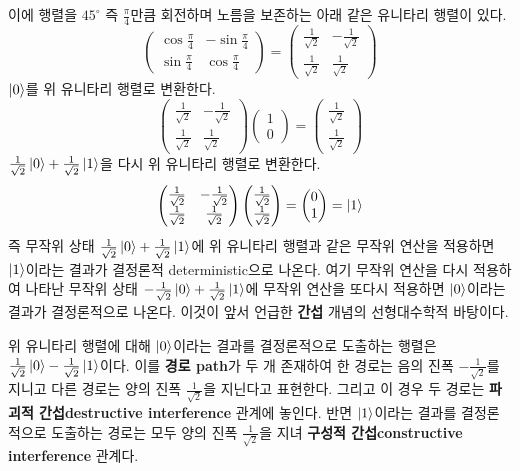 \documentclass[a4paper,chapter,atbegshi]{oblivoir}
\begin{document}
이에 행렬을 $45^{\circ}$ 즉 $\frac{\pi}{4}$만큼 회전하며 노름을 보존하는
아래 같은 유니타리 행렬이 있다.
\[
  \begin{pmatrix}
    \cos\frac{\pi}{4} &-\sin\frac{\pi}{4}\\
    \sin\frac{\pi}{4} &\cos\frac{\pi}{4}
  \end{pmatrix}
  = \begin{pmatrix}
    \frac{1}{\sqrt{2}} &-\frac{1}{\sqrt{2}} \\
    \frac{1}{\sqrt{2}} &\frac{1}{\sqrt2}
  \end{pmatrix}
\]
$\ket0$를 위 유니타리 행렬로 변환한다.
\begin{equation}\label{eq:1-2}
  \begin{pmatrix}
    \frac{1}{\sqrt{2}} &-\frac{1}{\sqrt{2}} \\
    \frac{1}{\sqrt{2}} &\frac{1}{\sqrt2}
  \end{pmatrix}
  \begin{pmatrix}
    1\\0
  \end{pmatrix}
  =\begin{pmatrix}
    \frac{1}{\sqrt2}\\\frac{1}{\sqrt2}
  \end{pmatrix}
\end{equation}
$\frac{1}{\sqrt2}\ket{0}+\frac{1}{\sqrt2}\ket{1}$을 다시 위 유니타리 행렬로
변환한다.
\[
  \begin{pmatrix}
    \frac{1}{\sqrt{2}} &-\frac{1}{\sqrt{2}} \\
    \frac{1}{\sqrt{2}} &\frac{1}{\sqrt2}
  \end{pmatrix}
  \begin{pmatrix}
    \frac{1}{\sqrt2}\\\frac{1}{\sqrt2}
  \end{pmatrix}
  =\begin{pmatrix}0\\1\end{pmatrix}=\ket{1}
\]
즉 무작위 상태 $\frac{1}{\sqrt2}\ket{0}+\frac{1}{\sqrt2}\ket{1}$에 위 유니타리
행렬과 같은 무작위 연산을 적용하면 $\ket{1}$이라는 결과가 결정론적{\tiny
deterministic}으로 나온다. 여기 무작위 연산을 다시 적용하여 나타난 무작위 상태
 $-\frac{1}{\sqrt2}\ket{0}+\frac{1}{\sqrt2}\ket{1}$에 무작위 연산을 또다시
 적용하면 $\ket{0}$이라는 결과가 결정론적으로 나온다. 이것이 앞서 언급한
 \textbf{간섭} 개념의 선형대수학적 바탕이다. 

 위 유니타리 행렬에 대해 $\ket{0}$이라는 결과를 결정론적으로 도출하는 행렬은
 $\frac{1}{\sqrt2}\ket0-\frac{1}{\sqrt2}\ket{1}$이다. 이를 \textbf{경로\tiny
 path}가 두 개 존재하여 한 경로는 음의 진폭 $-\frac{1}{\sqrt2}$를 지니고 
 다른 경로는 양의 진폭 $\frac{1}{\sqrt2}$을 지닌다고 표현한다. 그리고 이 경우
 두 경로는 \textbf{파괴적 간섭\tiny destructive interference} 관계에 놓인다. 
 반면 $\ket{1}$이라는 결과를 결정론적으로 도출하는 경로는 모두 양의 진폭
 $\frac{1}{\sqrt2}$을 지녀 \textbf{구성적 간섭\tiny constructive interference}
 관계다.
\end{document}
